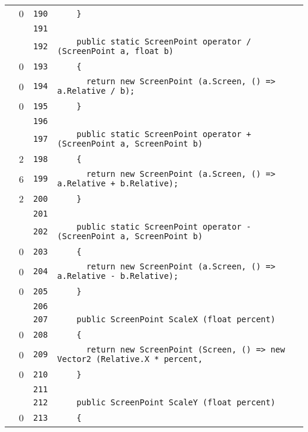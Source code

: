 \documentclass[a4paper,10pt]{article}
\begin{document}
\begin{longtable}[l]{lrrl}
\cellcolor{red} & 0 & \verb~190~ & \verb~    }~\\
\cellcolor{gray} &  & \verb~191~ & \verb~~\\
\cellcolor{gray} &  & \verb~192~ & \verb~    public static ScreenPoint operator / (ScreenPoint a, float b)~\\
\cellcolor{red} & 0 & \verb~193~ & \verb~    {~\\
\cellcolor{red} & 0 & \verb~194~ & \verb~      return new ScreenPoint (a.Screen, () => a.Relative / b);~\\
\cellcolor{red} & 0 & \verb~195~ & \verb~    }~\\
\cellcolor{gray} &  & \verb~196~ & \verb~~\\
\cellcolor{gray} &  & \verb~197~ & \verb~    public static ScreenPoint operator + (ScreenPoint a, ScreenPoint b)~\\
\cellcolor{green} & 2 & \verb~198~ & \verb~    {~\\
\cellcolor{green} & 6 & \verb~199~ & \verb~      return new ScreenPoint (a.Screen, () => a.Relative + b.Relative);~\\
\cellcolor{green} & 2 & \verb~200~ & \verb~    }~\\
\cellcolor{gray} &  & \verb~201~ & \verb~~\\
\cellcolor{gray} &  & \verb~202~ & \verb~    public static ScreenPoint operator - (ScreenPoint a, ScreenPoint b)~\\
\cellcolor{red} & 0 & \verb~203~ & \verb~    {~\\
\cellcolor{red} & 0 & \verb~204~ & \verb~      return new ScreenPoint (a.Screen, () => a.Relative - b.Relative);~\\
\cellcolor{red} & 0 & \verb~205~ & \verb~    }~\\
\cellcolor{gray} &  & \verb~206~ & \verb~~\\
\cellcolor{gray} &  & \verb~207~ & \verb~    public ScreenPoint ScaleX (float percent)~\\
\cellcolor{red} & 0 & \verb~208~ & \verb~    {~\\
\cellcolor{red} & 0 & \verb~209~ & \verb~      return new ScreenPoint (Screen, () => new Vector2 (Relative.X * percent,~\\
\cellcolor{red} & 0 & \verb~210~ & \verb~    }~\\
\cellcolor{gray} &  & \verb~211~ & \verb~~\\
\cellcolor{gray} &  & \verb~212~ & \verb~    public ScreenPoint ScaleY (float percent)~\\
\cellcolor{red} & 0 & \verb~213~ & \verb~    {~\\

\end{longtable}
\end{document}
